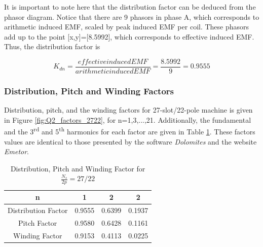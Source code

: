 \documentclass[a4paper, 11pt]{article}
\begin{document}
It is important to note here that the distribution factor can be deduced from the phasor diagram. Notice that there are 9 phasors in phase A, which corresponds to arithmetic induced EMF, scaled by peak induced EMF per coil. These phasors add up to the point [x,y]=[8.5992], which corresponds to effective induced EMF. Thus, the distribution factor is

\begin{equation}
K_{dn} = \frac{effective induced EMF}{arithmetic induced EMF}=\frac{8.5992}{9}=0.9555
\label{eq:distribution_factor_phasor}
\end{equation}



\subsubsection{Distribution, Pitch and Winding Factors}



Distribution, pitch, and the winding factors for 27-slot/22-pole machine is given in Figure \ref{fig:Q2_factors_2722}, for n=1,3,...,21. Additionally, the fundamental and the 3\textsuperscript{rd} and 5\textsuperscript{th} harmonics for each factor are given in Table \ref{tab:Q2_factors_2722}. These factors values are identical to those presented by the software \textit{Dolomites} and the website \textit{Emetor}.


\begin{table}[h!]
\centering
	\begin{tabular}{|c| c c c|} 
		\hline
		n & 1 & 2 & 2 \\ [0.5ex] 
		\hline
		Distribution Factor & 0.9555 & 0.6399 & 0.1937 \\ 
		\hline
		Pitch Factor & 0.9580 & 0.6428 & 0.1161 \\
		\hline
		Winding Factor & 0.9153 & 0.4113 & 0.0225 \\
		\hline
	\end{tabular}
	\caption{Distribution, Pitch and Winding Factor for $\frac{N_s}{2p}=27/22$}
	\label{tab:Q2_factors_2722}
\end{table}
\end{document}
